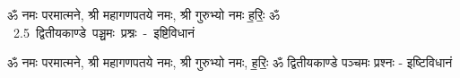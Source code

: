 \documentclass[17pt]{extarticle}
\begin{document}
\begin{titlepage}
    \begin{center}
 
\begin{sanskrit}
    { \Large
    ॐ नमः परमात्मने, श्री महागणपतये नमः, श्री गुरुभ्यो नमः
ह॒रिः॒ ॐ 
    }
    \\
    \vspace{2.5cm}
    \mbox{ \Huge
    2.5      द्वितीयकाण्डे पञ्चमः प्रश्नः - इष्टिविधानं   }
\end{sanskrit}
\end{center}

\end{titlepage}
\tableofcontents

ॐ नमः परमात्मने, श्री महागणपतये नमः, 
श्री गुरुभ्यो नमः, ह॒रिः॒ ॐ       द्वितीयकाण्डे पञ्चमः प्रश्नः - इष्टिविधानं \newline

\end{document}
